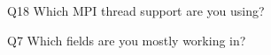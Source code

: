 \begin{description}%
\item{Q18} Which MPI thread support are you using?%
\item{Q7} Which fields are you mostly working in?%
\end{description}%
